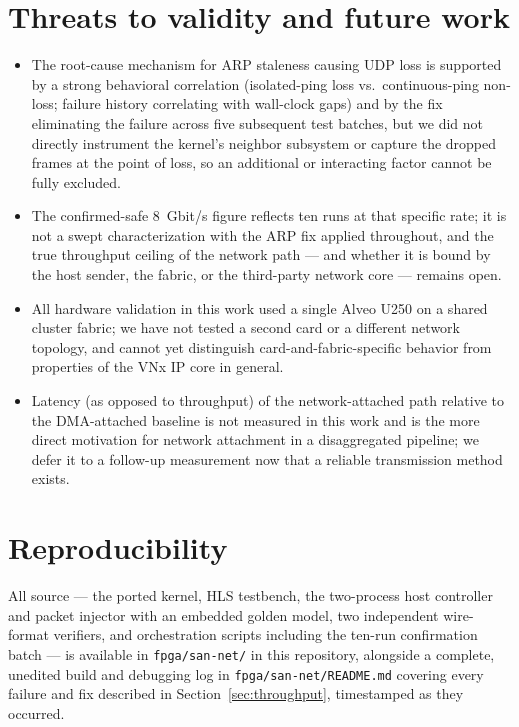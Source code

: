 \documentclass[11pt,a4paper]{article}
\newcommand{\code}[1]{\texttt{#1}}
\begin{document}
\section{Threats to validity and future work}

\begin{itemize}
  \item The root-cause mechanism for ARP staleness causing UDP loss is
    supported by a strong behavioral correlation (isolated-ping loss vs.\
    continuous-ping non-loss; failure history correlating with
    wall-clock gaps) and by the fix eliminating the failure across five
    subsequent test batches, but we did not directly instrument the
    kernel's neighbor subsystem or capture the dropped frames at the
    point of loss, so an additional or interacting factor cannot be
    fully excluded.
  \item The confirmed-safe 8~Gbit/s figure reflects ten runs at that
    specific rate; it is not a swept characterization with the ARP fix
    applied throughout, and the true throughput ceiling of the network
    path --- and whether it is bound by the host sender, the fabric, or
    the third-party network core --- remains open.
  \item All hardware validation in this work used a single Alveo U250
    on a shared cluster fabric; we have not tested a second card or a
    different network topology, and cannot yet distinguish
    card-and-fabric-specific behavior from properties of the VNx IP
    core in general.
  \item Latency (as opposed to throughput) of the network-attached path
    relative to the DMA-attached baseline is not measured in this work
    and is the more direct motivation for network attachment in a
    disaggregated pipeline; we defer it to a follow-up measurement now
    that a reliable transmission method exists.
\end{itemize}

\section*{Reproducibility}

All source --- the ported kernel, HLS testbench, the two-process host
controller and packet injector with an embedded golden model, two
independent wire-format verifiers, and orchestration scripts including
the ten-run confirmation batch --- is available in \code{fpga/san-net/}
in this repository, alongside a complete, unedited build and debugging
log in \code{fpga/san-net/README.md} covering every failure and fix
described in Section~\ref{sec:throughput}, timestamped as they occurred.
\end{document}
